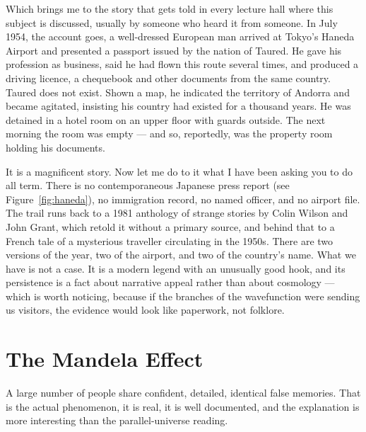 Which brings me to the story that gets told in every lecture hall where this subject is discussed,
usually by someone who heard it from someone. In July 1954, the account goes, a well-dressed
European man arrived at Tokyo's Haneda Airport and presented a passport issued by the nation of
Taured. He gave his profession as business, said he had flown this route several times, and
produced a driving licence, a chequebook and other documents from the same country. Taured does
not exist. Shown a map, he indicated the territory of Andorra and became agitated, insisting his
country had existed for a thousand years. He was detained in a hotel room on an upper floor with
guards outside. The next morning the room was empty --- and so, reportedly, was the property
room holding his documents.

It is a magnificent story. Now let me do to it what I have been asking you to do all term.
There is no contemporaneous Japanese press report (see Figure~\ref{fig:haneda}), no immigration record, no named officer, and
no airport file. The trail runs back to a 1981 anthology of strange stories by Colin Wilson and
John Grant, which retold it without a primary source, and behind that to a French tale of a
mysterious traveller circulating in the 1950s. There are two versions of the year, two of the
airport, and two of the country's name.  What we have is not a case. It is a modern legend with
an unusually good hook, and its persistence is a fact about narrative appeal rather than about
cosmology --- which is worth noticing, because if the branches of the wavefunction were sending
us visitors, the evidence would look like paperwork, not folklore.

\section{The Mandela Effect}\label{sec:mandelaeffect}

A large number of people share confident, detailed, identical false memories. That is the actual
phenomenon, it is real, it is well documented, and the explanation is more interesting than the
parallel-universe reading.

